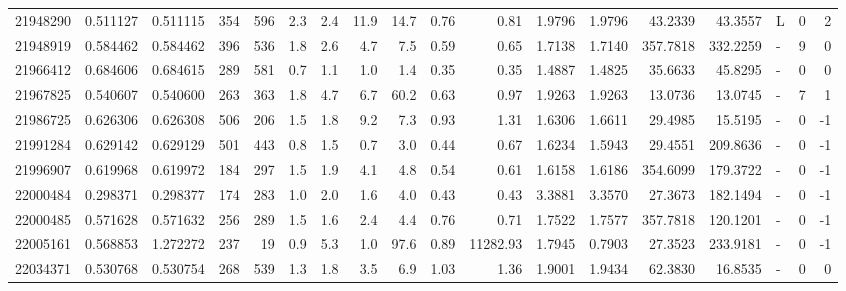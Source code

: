 \begin{tabular}{rrrrrrrrrrrrrrrlrr}
  21948290 & 0.511127 &   0.511115 &  354 &  596 &      2.3 &      2.4 &    11.9 &     14.7 &       0.76 &        0.81 &  1.9796 &  1.9796 &   43.2339 &   43.3557 &             L &        0 &          2 \\
  21948919 & 0.584462 &   0.584462 &  396 &  536 &      1.8 &      2.6 &     4.7 &      7.5 &       0.59 &        0.65 &  1.7138 &  1.7140 &  357.7818 &  332.2259 &             - &        9 &          0 \\
  21966412 & 0.684606 &   0.684615 &  289 &  581 &      0.7 &      1.1 &     1.0 &      1.4 &       0.35 &        0.35 &  1.4887 &  1.4825 &   35.6633 &   45.8295 &             - &        0 &          0 \\
  21967825 & 0.540607 &   0.540600 &  263 &  363 &      1.8 &      4.7 &     6.7 &     60.2 &       0.63 &        0.97 &  1.9263 &  1.9263 &   13.0736 &   13.0745 &             - &        7 &          1 \\
  21986725 & 0.626306 &   0.626308 &  506 &  206 &      1.5 &      1.8 &     9.2 &      7.3 &       0.93 &        1.31 &  1.6306 &  1.6611 &   29.4985 &   15.5195 &             - &        0 &         -1 \\
  21991284 & 0.629142 &   0.629129 &  501 &  443 &      0.8 &      1.5 &     0.7 &      3.0 &       0.44 &        0.67 &  1.6234 &  1.5943 &   29.4551 &  209.8636 &             - &        0 &         -1 \\
  21996907 & 0.619968 &   0.619972 &  184 &  297 &      1.5 &      1.9 &     4.1 &      4.8 &       0.54 &        0.61 &  1.6158 &  1.6186 &  354.6099 &  179.3722 &             - &        0 &         -1 \\
  22000484 & 0.298371 &   0.298377 &  174 &  283 &      1.0 &      2.0 &     1.6 &      4.0 &       0.43 &        0.43 &  3.3881 &  3.3570 &   27.3673 &  182.1494 &             - &        0 &         -1 \\
  22000485 & 0.571628 &   0.571632 &  256 &  289 &      1.5 &      1.6 &     2.4 &      4.4 &       0.76 &        0.71 &  1.7522 &  1.7577 &  357.7818 &  120.1201 &             - &        0 &         -1 \\
  22005161 & 0.568853 &   1.272272 &  237 &   19 &      0.9 &      5.3 &     1.0 &     97.6 &       0.89 &    11282.93 &  1.7945 &  0.7903 &   27.3523 &  233.9181 &             - &        0 &         -1 \\
  22034371 & 0.530768 &   0.530754 &  268 &  539 &      1.3 &      1.8 &     3.5 &      6.9 &       1.03 &        1.36 &  1.9001 &  1.9434 &   62.3830 &   16.8535 &             - &        0 &          0 \\

\end{tabular}

